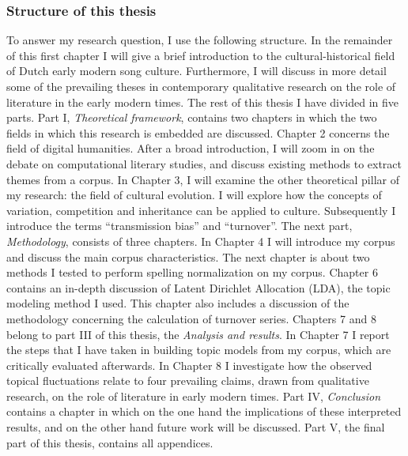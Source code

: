 \subsubsection{Structure of this thesis}
To answer my research question, I use the following structure. In the remainder of this first chapter I will give a brief introduction to the cultural-historical field of Dutch early modern song culture. Furthermore, I will discuss in more detail some of the prevailing theses in contemporary qualitative research on the role of literature in the early modern times. The rest of this thesis I have divided in five parts. Part I, \textit{Theoretical framework}, contains two chapters in which the two fields in which this research is embedded are discussed. Chapter 2 concerns the field of digital humanities. After a broad introduction, I will zoom in on the debate on computational literary studies, and discuss existing methods to extract themes from a corpus. In Chapter 3, I will examine the other theoretical pillar of my research: the field of cultural evolution. I will explore how the concepts of variation, competition and inheritance can be applied to culture. Subsequently I introduce the terms \enquote{transmission bias} and \enquote{turnover}. The next part, \textit{Methodology}, consists of three chapters. In Chapter 4 I will introduce my corpus and discuss the main corpus characteristics. The next chapter is about two methods I tested to perform spelling normalization on my corpus. Chapter 6 contains an in-depth discussion of Latent Dirichlet Allocation (LDA), the topic modeling method I used. This chapter also includes a discussion of the  methodology concerning the calculation of turnover series. Chapters 7 and 8 belong to part III of this thesis, the \textit{Analysis and results}. In Chapter 7 I report the steps that I have taken in building topic models from my corpus, which are critically evaluated afterwards. In Chapter 8 I investigate how the observed topical fluctuations relate to four prevailing claims, drawn from qualitative research, on the role of literature in early modern times. Part IV, \textit{Conclusion} contains a chapter in which on the one hand the implications of these interpreted results, and on the other hand future work will be discussed. Part V, the final part of this thesis, contains all appendices.

